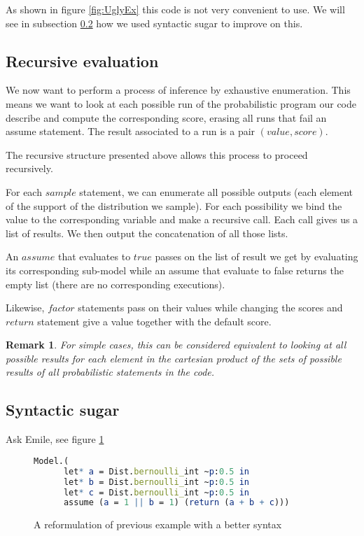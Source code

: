 \documentclass{article}
\newcommand\SC[1]{{\color{violet}{\it \bf Simon :} #1}}
\newtheorem{remark}{Remark}
\begin{document}
	As shown in figure \ref{fig:UglyEx} this code is not very convenient to use. We will see in subsection \ref{subseq:sugar} how we used syntactic sugar to improve on this.

	\subsection{Recursive evaluation}

	We now want to perform a process of inference by exhaustive enumeration.
	This means we want to look at each possible run of the probabilistic program our code describe and compute the corresponding score, erasing all runs that fail an assume statement.
	The result associated to a run is a pair $(value, score)$.

	The recursive structure presented above allows this process to proceed recursively.

	For each $sample$ statement, we can enumerate all possible outputs (each element of the support of the distribution we sample). For each possibility we bind the value to the corresponding variable and make a recursive call.
	Each call gives us a list of results. We then output the concatenation of all those lists.

	An $assume$ that evaluates to $true$ passes on the list of result we get by evaluating its corresponding sub-model while an assume that evaluate to false returns the empty list (there are no corresponding executions).

	Likewise, $factor$ statements pass on their values while changing the scores and $return$ statement give a value together with the default score.

	\begin{remark}
	  For simple cases, this can be considered equivalent to looking at all possible results for each element in the cartesian product of the sets of possible results of all probabilistic statements in the code.
	\end{remark}

	\subsection{Syntactic sugar}
	\label{subseq:sugar}

	\SC{Ask Emile, see figure \ref{fig:sugar}}

	\begin{figure}[h]
	  \centering
	\begin{lstlisting}[language=Mathematica,frame=single]
    Model.(
      let* a = Dist.bernoulli_int ~p:0.5 in
      let* b = Dist.bernoulli_int ~p:0.5 in
      let* c = Dist.bernoulli_int ~p:0.5 in
      assume (a = 1 || b = 1) (return (a + b + c)))
	\end{lstlisting}
	\caption{A reformulation of previous example with a better syntax}
	  \label{fig:sugar}
	\end{figure}
\end{document}
